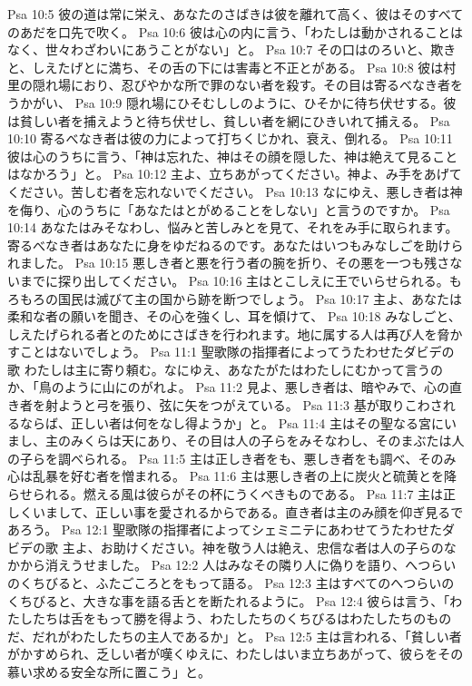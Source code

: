 Psa 10:5  彼の道は常に栄え、あなたのさばきは彼を離れて高く、彼はそのすべてのあだを口先で吹く。
Psa 10:6  彼は心の内に言う、「わたしは動かされることはなく、世々わざわいにあうことがない」と。
Psa 10:7  その口はのろいと、欺きと、しえたげとに満ち、その舌の下には害毒と不正とがある。
Psa 10:8  彼は村里の隠れ場におり、忍びやかな所で罪のない者を殺す。その目は寄るべなき者をうかがい、
Psa 10:9  隠れ場にひそむししのように、ひそかに待ち伏せする。彼は貧しい者を捕えようと待ち伏せし、貧しい者を網にひきいれて捕える。
Psa 10:10  寄るべなき者は彼の力によって打ちくじかれ、衰え、倒れる。
Psa 10:11  彼は心のうちに言う、「神は忘れた、神はその顔を隠した、神は絶えて見ることはなかろう」と。
Psa 10:12  主よ、立ちあがってください。神よ、み手をあげてください。苦しむ者を忘れないでください。
Psa 10:13  なにゆえ、悪しき者は神を侮り、心のうちに「あなたはとがめることをしない」と言うのですか。
Psa 10:14  あなたはみそなわし、悩みと苦しみとを見て、それをみ手に取られます。寄るべなき者はあなたに身をゆだねるのです。あなたはいつもみなしごを助けられました。
Psa 10:15  悪しき者と悪を行う者の腕を折り、その悪を一つも残さないまでに探り出してください。
Psa 10:16  主はとこしえに王でいらせられる。もろもろの国民は滅びて主の国から跡を断つでしょう。
Psa 10:17  主よ、あなたは柔和な者の願いを聞き、その心を強くし、耳を傾けて、
Psa 10:18  みなしごと、しえたげられる者とのためにさばきを行われます。地に属する人は再び人を脅かすことはないでしょう。
Psa 11:1  聖歌隊の指揮者によってうたわせたダビデの歌 わたしは主に寄り頼む。なにゆえ、あなたがたはわたしにむかって言うのか、「鳥のように山にのがれよ。
Psa 11:2  見よ、悪しき者は、暗やみで、心の直き者を射ようと弓を張り、弦に矢をつがえている。
Psa 11:3  基が取りこわされるならば、正しい者は何をなし得ようか」と。
Psa 11:4  主はその聖なる宮にいまし、主のみくらは天にあり、その目は人の子らをみそなわし、そのまぶたは人の子らを調べられる。
Psa 11:5  主は正しき者をも、悪しき者をも調べ、そのみ心は乱暴を好む者を憎まれる。
Psa 11:6  主は悪しき者の上に炭火と硫黄とを降らせられる。燃える風は彼らがその杯にうくべきものである。
Psa 11:7  主は正しくいまして、正しい事を愛されるからである。直き者は主のみ顔を仰ぎ見るであろう。
Psa 12:1  聖歌隊の指揮者によってシェミニテにあわせてうたわせたダビデの歌 主よ、お助けください。神を敬う人は絶え、忠信な者は人の子らのなかから消えうせました。
Psa 12:2  人はみなその隣り人に偽りを語り、へつらいのくちびると、ふたごころとをもって語る。
Psa 12:3  主はすべてのへつらいのくちびると、大きな事を語る舌とを断たれるように。
Psa 12:4  彼らは言う、「わたしたちは舌をもって勝を得よう、わたしたちのくちびるはわたしたちのものだ、だれがわたしたちの主人であるか」と。
Psa 12:5  主は言われる、「貧しい者がかすめられ、乏しい者が嘆くゆえに、わたしはいま立ちあがって、彼らをその慕い求める安全な所に置こう」と。
